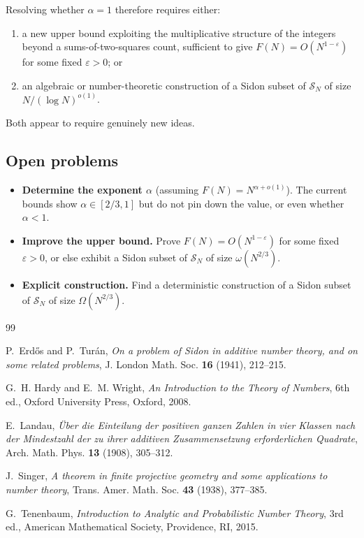 \documentclass[12pt]{article}
\theoremstyle{definition}
\newcommand{\SN}{\mathcal{S}_N}
\begin{document}
\medskip\noindent
Resolving whether $\alpha = 1$ therefore requires either:
\begin{enumerate}
  \item a new upper bound exploiting the multiplicative structure of the
        integers beyond a sums-of-two-squares count, sufficient to give
        $F(N) = O(N^{1-\varepsilon})$ for some fixed $\varepsilon > 0$; or
  \item an algebraic or number-theoretic construction of a Sidon subset of
        $\SN$ of size $N/(\log N)^{o(1)}$.
\end{enumerate}
Both appear to require genuinely new ideas.

\subsection{Open problems}

\begin{itemize}
\item \textbf{Determine the exponent $\alpha$} (assuming $F(N) = N^{\alpha+o(1)}$).
  The current bounds show $\alpha \in [2/3,1]$ but do not pin down the
  value, or even whether $\alpha < 1$.
\item \textbf{Improve the upper bound.}  Prove $F(N) = O(N^{1-\varepsilon})$
  for some fixed $\varepsilon > 0$, or else exhibit a Sidon subset of $\SN$
  of size $\omega(N^{2/3})$.
\item \textbf{Explicit construction.}  Find a deterministic construction of
  a Sidon subset of $\SN$ of size $\Omega(N^{2/3})$.
\end{itemize}

\begin{thebibliography}{99}

P.~Erd\H{o}s and P.~Tur\'an,
\textit{On a problem of Sidon in additive number theory, and on some related problems},
J. London Math. Soc. \textbf{16} (1941), 212--215.

G.~H. Hardy and E.~M. Wright,
\textit{An Introduction to the Theory of Numbers},
6th ed., Oxford University Press, Oxford, 2008.

E.~Landau,
\textit{\"Uber die Einteilung der positiven ganzen Zahlen in vier Klassen
nach der Mindestzahl der zu ihrer additiven Zusammensetzung erforderlichen Quadrate},
Arch. Math. Phys. \textbf{13} (1908), 305--312.

J.~Singer,
\textit{A theorem in finite projective geometry and some applications to number theory},
Trans. Amer. Math. Soc. \textbf{43} (1938), 377--385.

G.~Tenenbaum,
\textit{Introduction to Analytic and Probabilistic Number Theory},
3rd ed., American Mathematical Society, Providence, RI, 2015.

\end{thebibliography}
\end{document}
